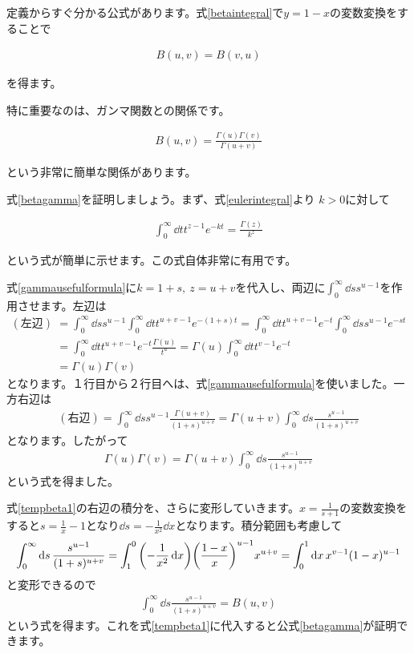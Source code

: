 \documentclass[report,paper=a4, fontsize=12pt, line_length=16cm, number_of_lines=33,dvipdfmx]{jlreq}
\newenvironment{important}{\begin{tcolorbox}[
  colback = white,
  colframe = red!35,
  boxrule = 2mm,
  fonttitle = \bfseries,
  after = \noindent] }{\end{tcolorbox}}
\numberwithin{equation}{section}
\begin{document}
定義からすぐ分かる公式があります。式\eqref{betaintegral}で$y=1-x$の変数変換をすることで
\begin{important}
  \begin{align}
    B(u,v)=B(v,u)
  \end{align}
\end{important}
を得ます。

特に重要なのは、ガンマ関数との関係です。
\begin{important}
  \begin{align}
    B(u,v)=\frac{\Gamma(u)\Gamma(v)}{\Gamma(u+v)}\label{betagamma}
  \end{align}
\end{important}
という非常に簡単な関係があります。

式\eqref{betagamma}を証明しましょう。まず、式\eqref{eulerintegral}より
$k>0$に対して
\begin{important}
  \begin{align}
    \int_{0}^{\infty}\dd{t}t^{z-1}e^{-kt}=\frac{\Gamma(z)}{k^z}
    \label{gammausefulformula}
  \end{align}    
\end{important}
という式が簡単に示せます。この式自体非常に有用です。

式\eqref{gammausefulformula}に$k=1+s,\ z=u+v$を代入し、両辺に$\int_{0}^{\infty}\dd{s} s^{u-1}$を作用させます。左辺は
\begin{align}
  (\text{左辺})
  &=\int_{0}^{\infty}\dd{s} s^{u-1}\int_{0}^{\infty}\dd{t}t^{u+v-1}e^{-(1+s)t}
  =\int_{0}^{\infty}\dd{t}t^{u+v-1}e^{-t}\int_{0}^{\infty}\dd{s} s^{u-1}e^{-st}\nonumber\\
  &=\int_{0}^{\infty}\dd{t}t^{u+v-1}e^{-t}\frac{\Gamma(u)}{t^{u}}
  =\Gamma(u)\int_{0}^{\infty}\dd{t}t^{v-1}e^{-t}\nonumber\\
  &=\Gamma(u)\Gamma(v)
\end{align}
となります。１行目から２行目へは、式\eqref{gammausefulformula}を使いました。一方右辺は
\begin{align}
  (\text{右辺})=\int_{0}^{\infty}\dd{s} s^{u-1}\frac{\Gamma(u+v)}{(1+s)^{u+v}}=\Gamma(u+v)\int_{0}^{\infty}\dd{s} \frac{s^{u-1}}{(1+s)^{u+v}}
\end{align}
となります。したがって
\begin{align}
  \Gamma(u)\Gamma(v)=\Gamma(u+v)\int_{0}^{\infty}\dd{s} \frac{s^{u-1}}{(1+s)^{u+v}}\label{tempbeta1}
\end{align}
という式を得ました。

式\eqref{tempbeta1}の右辺の積分を、さらに変形していきます。$x=\frac{1}{s+1}$の変数変換をすると$s=\frac{1}{x}-1$となり$\dd{s}=-\frac{1}{x^2} \dd{x}$となります。積分範囲も考慮して
\begin{align}
  \int_{0}^{\infty}\dd{s} \frac{s^{u-1}}{(1+s)^{u+v}}
  =\int_{1}^{0}\qty(-\frac{1}{x^2} \dd{x})\qty(\frac{1-x}{x})^{u-1}x^{u+v}
  =\int_{0}^{1}\dd{x}x^{v-1}(1-x)^{u-1}
\end{align}
と変形できるので
\begin{align}
  \int_{0}^{\infty}\dd{s} \frac{s^{u-1}}{(1+s)^{u+v}}=B(u,v)\label{betaformula2}
\end{align}
という式を得ます。これを式\eqref{tempbeta1}に代入すると公式\eqref{betagamma}が証明できます。
\end{document}
